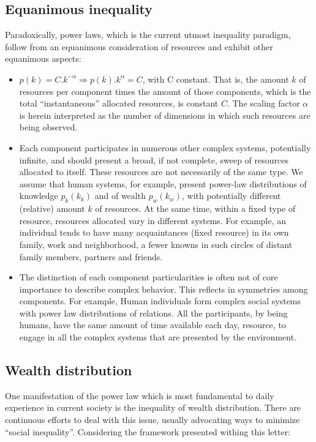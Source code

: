 \documentclass[a4paper, 11pt]{article} %
\begin{document}
\subsection{Equanimous inequality}
Paradoxically, power laws, which is the 
current utmost inequality paradigm,
follow from an equanimous consideration
of resources and exhibit other equanimous aspects:
\begin{itemize}
	\item $p(k)=C.k^{-\alpha} \Rightarrow p(k).k^{\alpha}=C$, with C constant. That is, the amount $k$ of resources per component times the amount of those components, which is the total ``instantaneous'' allocated resources, is constant $C$. The scaling factor $\alpha$ is herein interpreted as the number of dimensions in which such resources are being observed.
	\item Each component participates in numerous other complex systems, potentially infinite, and should present a broad, if not complete, sweep of resources allocated to itself.
		These resources are not necessarily of the same type. We assume that human systems, for example, present power-law distributions of knowledge $p_k(k_k)$ and of wealth $p_w(k_w)$, with potentially different (relative) amount $k$ of resources. At the same time, within a fixed type of resource, resources allocated vary in  different systems. For example, an individual tends to have many acquaintances (fixed resource) in its own family, work and neighborhood, a fewer knowns in such circles of distant family members, partners and friends.
	\item The distinction of each component particularities is often not of core importance to describe complex behavior.
		This reflects in symmetries among components. For example, Human individuals form complex social systems with power law distributions of relations. All the participants, by being humans, have the same amount of time available each day, resource, to engage in all the complex systems that are presented by the environment. 
\end{itemize}


\subsection{Wealth distribution}
One manifestation of the power law
which is most fundamental to daily experience
in current society is the inequality of wealth distribution.
There are continuous efforts to deal with this issue,
usually advocating ways to minimize ``social inequality''.
Considering the framework presented withing this letter:
\end{document}

